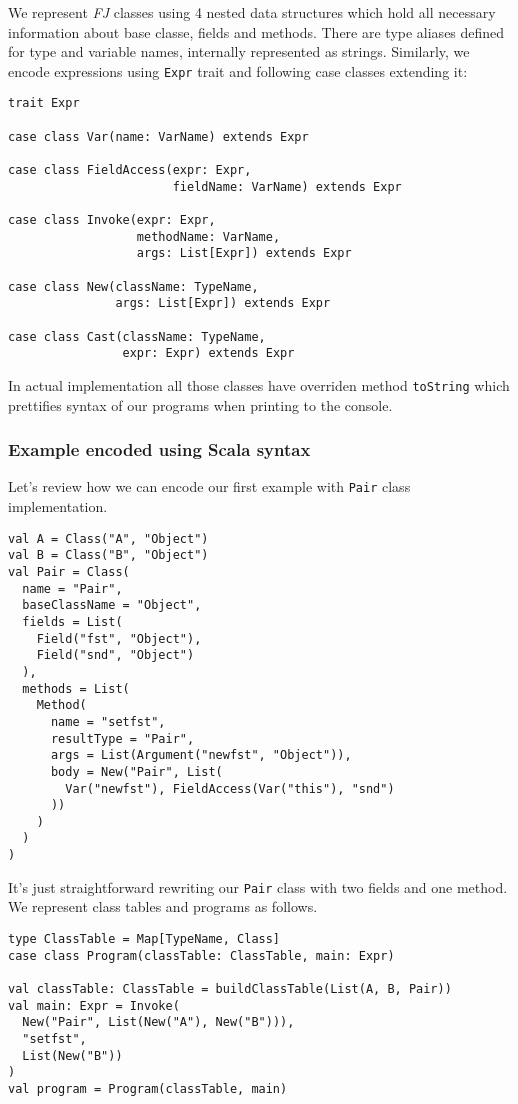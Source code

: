 \documentclass{article}[12pt]
\begin{document}
We represent \emph{FJ} classes using 4 nested data structures
which hold all necessary information about base classe, fields
and methods. There are type aliases defined for type and variable
names, internally represented as strings. Similarly, we encode
expressions using \texttt{Expr} trait and following case classes
extending it:

\begin{verbatim}
trait Expr

case class Var(name: VarName) extends Expr

case class FieldAccess(expr: Expr,
                       fieldName: VarName) extends Expr

case class Invoke(expr: Expr,
                  methodName: VarName,
                  args: List[Expr]) extends Expr

case class New(className: TypeName,
               args: List[Expr]) extends Expr

case class Cast(className: TypeName,
                expr: Expr) extends Expr
\end{verbatim}

In actual implementation all those classes have overriden
method \texttt{toString} which prettifies syntax of our
programs when printing to the console.

\subsubsection{Example encoded using Scala syntax}

Let's review how we can encode our first example with
\texttt{Pair} class implementation.

\begin{verbatim}
val A = Class("A", "Object")
val B = Class("B", "Object")
val Pair = Class(
  name = "Pair",
  baseClassName = "Object",
  fields = List(
    Field("fst", "Object"),
    Field("snd", "Object")
  ),
  methods = List(
    Method(
      name = "setfst",
      resultType = "Pair",
      args = List(Argument("newfst", "Object")),
      body = New("Pair", List(
        Var("newfst"), FieldAccess(Var("this"), "snd")
      ))
    )
  )
)
\end{verbatim}
It's just straightforward rewriting our \texttt{Pair} class
with two fields and one method. We represent class tables and
programs as follows.

\begin{verbatim}
type ClassTable = Map[TypeName, Class]
case class Program(classTable: ClassTable, main: Expr)

val classTable: ClassTable = buildClassTable(List(A, B, Pair))
val main: Expr = Invoke(
  New("Pair", List(New("A"), New("B"))),
  "setfst",
  List(New("B"))
)
val program = Program(classTable, main)
\end{verbatim}
\end{document}
